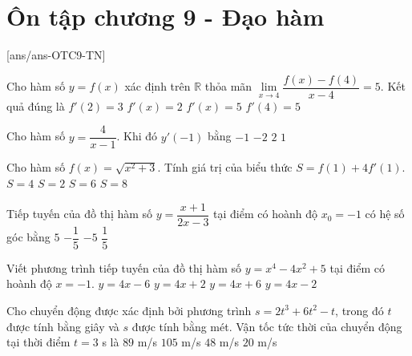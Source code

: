 \section{Ôn tập chương 9 - Đạo hàm}
[ans/ans-OTC9-TN]
\caulc
\begin{ex}%
	Cho hàm số $y=f(x)$ xác định trên $\mathbb{R}$ thỏa mãn $\lim\limits_{x\to 4}\dfrac{f(x)-f(4)}{x-4}=5$. Kết quả đúng là
	\choice
	{$f'(2)=3$}
	{$f'(x)=2$}
	{$f'(x)=5$}
	{\True $f'(4)=5$}
\end{ex}
\begin{ex}%
	Cho hàm số $y=\dfrac{4}{x-1}$. Khi đó $y'(-1)$ bằng
	\choice
	{\True $-1$}
	{$-2$}
	{$2$}
	{$1$}
\end{ex}
\begin{ex}%
	Cho hàm số $f(x)=\sqrt{x^2+3}$. Tính giá trị của biểu thức $S=f(1)+4f'(1)$. 
	\choice
	{\True $S=4$}
	{$S=2$}
	{$S=6$}
	{$S=8$}
\end{ex}
\begin{ex}%
	Tiếp tuyến của đồ thị hàm số $y=\dfrac{x+1}{2x-3}$ tại điểm có hoành độ $x_0=-1$ có hệ số góc bằng
	\choice
	{$5$}
	{\True $-\dfrac{1}{5}$}
	{$-5$}
	{$\dfrac{1}{5}$}
\end{ex}
\begin{ex}%
	Viết phương trình tiếp tuyến của đồ thị hàm số $y=x^4-4x^2+5$ tại điểm có hoành độ $x=-1$. 
	\choice
	{$y=4x-6$}
	{$y=4x+2$}
	{\True $y=4x+6$}
	{$y=4x-2$}
\end{ex}
\begin{ex}%
	Cho chuyển động được xác định bởi phương trình $s=2t^3+6t^2-t$, trong đó $t$ được tính bằng giây và $s$ được tính bằng mét. Vận tốc tức thời của chuyển động tại thời điểm $t=3$ s là 
	\choice
	{\True $89$ m/s}
	{$105$ m/s}
	{$48$ m/s}
	{$20$ m/s}
\end{ex}
